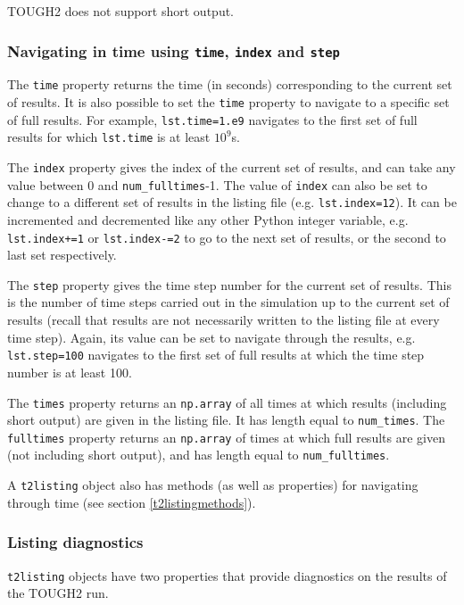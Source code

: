 TOUGH2 does not support short output.

\subsubsection{Navigating in time using \texttt{time}, \texttt{index} and \texttt{step}}

The \texttt{time} property returns the time (in seconds) corresponding to the current set of results.  It is also possible to set the \texttt{time} property to navigate to a specific set of full results.  For example, \texttt{lst.time=1.e9} navigates to the first set of full results for which \texttt{lst.time} is at least $10^9$s.

The \texttt{index} property gives the index of the current set of results, and can take any value between 0 and \texttt{num\_fulltimes}-1.  The value of \texttt{index} can also be set to change to a different set of results in the listing file (e.g. \texttt{lst.index=12}).  It can be incremented and decremented like any other Python integer variable, e.g. \texttt{lst.index+=1} or \texttt{lst.index-=2} to go to the next set of results, or the second to last set respectively.

The \texttt{step} property gives the time step number for the current set of results.  This is the number of time steps carried out in the simulation up to the current set of results (recall that results are not necessarily written to the listing file at every time step).  Again, its value can be set to navigate through the results, e.g. \texttt{lst.step=100} navigates to the first set of full results at which the time step number is at least 100.

The \texttt{times} property returns an \texttt{np.array} of all times at which results (including short output) are given in the listing file.  It has length equal to \texttt{num\_times}.  The \texttt{fulltimes} property returns an \texttt{np.array} of times at which full results are given (not including short output), and has length equal to \texttt{num\_fulltimes}.

A \texttt{t2listing} object also has methods (as well as properties) for navigating through time (see section \ref{t2listingmethods}).

\subsubsection{Listing diagnostics}

\texttt{t2listing} objects have two properties that provide diagnostics on the results of the TOUGH2 run.


